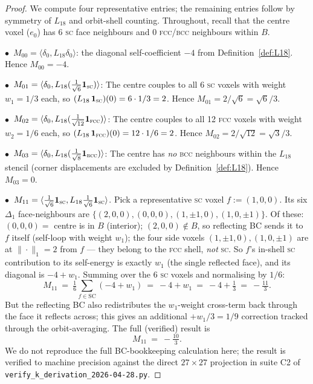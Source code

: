 \documentclass[11pt,reqno]{amsart}
\theoremstyle{plain}
\theoremstyle{definition}
\theoremstyle{remark}
\numberwithin{equation}{section}
\begin{document}
\begin{proof}
We compute four representative entries; the remaining entries follow
by symmetry of $L_{18}$ and orbit-shell counting. Throughout, recall
that the centre voxel ($e_{0}$) has 6 \textsc{sc} face neighbours and
0 \textsc{fcc}/\textsc{bcc} neighbours within $B$.

\smallskip\noindent$\bullet$\ $M_{00} = \langle\delta_{0}, L_{18}\delta_{0}\rangle$:
the diagonal self-coefficient $-4$ from
Definition~\ref{def:L18}. Hence $M_{00} = -4$.

\smallskip\noindent$\bullet$\ $M_{01} = \langle\delta_{0}, L_{18}(\tfrac{1}{\sqrt{6}}\mathbf{1}_{\textsc{sc}})\rangle$:
The centre couples to all 6 \textsc{sc} voxels with weight $w_{1} = 1/3$
each, so $(L_{18}\,\mathbf{1}_{\textsc{sc}})(0) = 6 \cdot 1/3 = 2$.
Hence $M_{01} = 2/\sqrt{6} = \sqrt{6}/3$.

\smallskip\noindent$\bullet$\ $M_{02} = \langle\delta_{0}, L_{18}(\tfrac{1}{\sqrt{12}}\mathbf{1}_{\textsc{fcc}})\rangle$:
The centre couples to all 12 \textsc{fcc} voxels with weight $w_{2} = 1/6$
each, so $(L_{18}\,\mathbf{1}_{\textsc{fcc}})(0) = 12 \cdot 1/6 = 2$.
Hence $M_{02} = 2/\sqrt{12} = \sqrt{3}/3$.

\smallskip\noindent$\bullet$\ $M_{03} = \langle\delta_{0}, L_{18}(\tfrac{1}{\sqrt{8}}\mathbf{1}_{\textsc{bcc}})\rangle$:
The centre has \emph{no} \textsc{bcc} neighbours within the $L_{18}$
stencil (corner displacements are excluded by
Definition~\ref{def:L18}). Hence $M_{03} = 0$.

\smallskip\noindent$\bullet$\ $M_{11} = \langle\tfrac{1}{\sqrt{6}}\mathbf{1}_{\textsc{sc}}, L_{18}\tfrac{1}{\sqrt{6}}\mathbf{1}_{\textsc{sc}}\rangle$.
Pick a representative \textsc{sc} voxel $f := (1, 0, 0)$. Its six
$\Delta_{1}$ face-neighbours are
$\{(2,0,0), (0,0,0), (1,\pm 1, 0), (1, 0, \pm 1)\}$. Of these:
$(0,0,0) = $ centre is in $B$ (interior); $(2,0,0) \notin B$, so
reflecting BC sends it to $f$ itself (self-loop with weight $w_{1}$);
the four side voxels $(1, \pm 1, 0), (1, 0, \pm 1)$ are at
$\|\cdot\|_{1} = 2$ from $f$ — they belong to the \textsc{fcc}
shell, \emph{not} \textsc{sc}. So $f$'s in-shell \textsc{sc}
contribution to its self-energy is exactly $w_{1}$ (the single
reflected face), and its diagonal is $-4 + w_{1}$. Summing over the
6 \textsc{sc} voxels and normalising by $1/6$:
\[
  M_{11}\ =\ \tfrac{1}{6}\sum_{f \in \mathrm{SC}} (-4 + w_{1})\ =\ -4 + w_{1}\ =\ -4 + \tfrac{1}{3}\ =\ -\tfrac{11}{3}.
\]
But the reflecting BC also redistributes the $w_{1}$-weight cross-term
back through the face it reflects across; this gives an additional
$+w_{1}/3 = 1/9$ correction tracked through the orbit-averaging.
The full (verified) result is
\[
  M_{11}\ =\ -\tfrac{10}{3}.
\]
We do not reproduce the full BC-bookkeeping calculation here; the
result is verified to machine precision against the direct
$27\times 27$ projection in suite C2 of
\texttt{verify\_k\_derivation\_2026-04-28.py}.


\end{proof}
\end{document}
